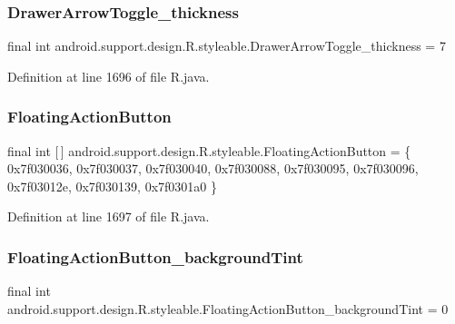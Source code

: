 \subsubsection{\texorpdfstring{DrawerArrowToggle\_thickness}{DrawerArrowToggle\_thickness}}
{\footnotesize\ttfamily final int android.\+support.\+design.\+R.\+styleable.\+Drawer\+Arrow\+Toggle\+\_\+thickness = 7\hspace{0.3cm}{\ttfamily [static]}}



Definition at line 1696 of file R.\+java.

\mbox{\label{classandroid_1_1support_1_1design_1_1_r_1_1styleable_ac39eabec239d50ec950ae5f013825830}} 
\subsubsection{\texorpdfstring{FloatingActionButton}{FloatingActionButton}}
{\footnotesize\ttfamily final int \mbox{[}$\,$\mbox{]} android.\+support.\+design.\+R.\+styleable.\+Floating\+Action\+Button = \{ 0x7f030036, 0x7f030037, 0x7f030040, 0x7f030088, 0x7f030095, 0x7f030096, 0x7f03012e, 0x7f030139, 0x7f0301a0 \}\hspace{0.3cm}{\ttfamily [static]}}



Definition at line 1697 of file R.\+java.

\mbox{\label{classandroid_1_1support_1_1design_1_1_r_1_1styleable_a85f23456b7532cd6277a61b75950a347}} 
\subsubsection{\texorpdfstring{FloatingActionButton\_backgroundTint}{FloatingActionButton\_backgroundTint}}
{\footnotesize\ttfamily final int android.\+support.\+design.\+R.\+styleable.\+Floating\+Action\+Button\+\_\+background\+Tint = 0\hspace{0.3cm}{\ttfamily [static]}}



